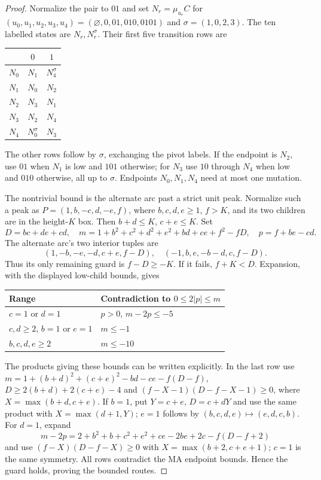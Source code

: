 \begin{proof}
Normalize the pair to $01$ and set $N_r=\mu_{u_r}C$ for
$(u_0,u_1,u_2,u_3,u_4)=(\varnothing,0,01,010,0101)$ and $\sigma=(1,0,2,3)$. The ten labelled states are $N_r,N_r^\sigma$. Their first five transition rows are
\begin{center}\begin{tabular}{c|cc}
 & $0$ & $1$\\\hline
$N_0$ & $N_1$ & $N_4^\sigma$\\
$N_1$ & $N_0$ & $N_2$\\
$N_2$ & $N_3$ & $N_1$\\
$N_3$ & $N_2$ & $N_4$\\
$N_4$ & $N_0^\sigma$ & $N_3$
\end{tabular}\end{center}
The other rows follow by $\sigma$, exchanging the pivot labels. If the endpoint is $N_2$, use $01$ when $N_1$ is low and $101$ otherwise; for $N_3$ use $10$ through $N_4$ when low and $010$ otherwise, all up to $\sigma$. Endpoints $N_0,N_1,N_4$ need at most one mutation.

The nontrivial bound is the alternate arc past a strict unit peak. Normalize such a peak as $P=(1,b,-c,d,-e,f)$, where $b,c,d,e\ge1$, $f>K$, and its two children are in the height-$K$ box. Then $b+d\le K$, $c+e\le K$. Set
\[
 D=bc+de+cd,\quad m=1+b^2+c^2+d^2+e^2+bd+ce+f^2-fD,\quad p=f+be-cd.
\]
The alternate arc's two interior tuples are
\[
 (1,-b,-e,-d,c+e,f-D),\quad(-1,b,e,-b-d,c,f-D).
\]
Thus its only remaining guard is $f-D\ge-K$. If it fails, $f+K<D$. Expansion, with the displayed low-child bounds, gives
\begin{center}\begin{tabular}{ll}\toprule
Range & Contradiction to $0\le2|p|\le m$\\\midrule
$c=1$ or $d=1$ & $p>0$, $m-2p\le-5$\\
$c,d\ge2$, $b=1$ or $e=1$ & $m\le-1$\\
$b,c,d,e\ge2$ & $m\le-10$\\\bottomrule
\end{tabular}\end{center}
The products giving these bounds can be written explicitly. In the last row use
$m=1+(b+d)^2+(c+e)^2-bd-ce-f(D-f)$,
$D\ge2(b+d)+2(c+e)-4$ and
$(f-X-1)(D-f-X-1)\ge0$, where $X=\max(b+d,c+e)$.
If $b=1$, put $Y=c+e$, $D=c+dY$ and use the same product with $X=\max(d+1,Y)$; $e=1$ follows by $(b,c,d,e)\mapsto(e,d,c,b)$.
For $d=1$, expand
\[
 m-2p=2+b^2+b+c^2+e^2+ce-2be+2c-f(D-f+2)
\]
and use $(f-X)(D-f-X)\ge0$ with $X=\max(b+2,c+e+1)$; $c=1$ is the same symmetry. All rows contradict the MA endpoint bounds. Hence the guard holds, proving the bounded routes.
\end{proof}

